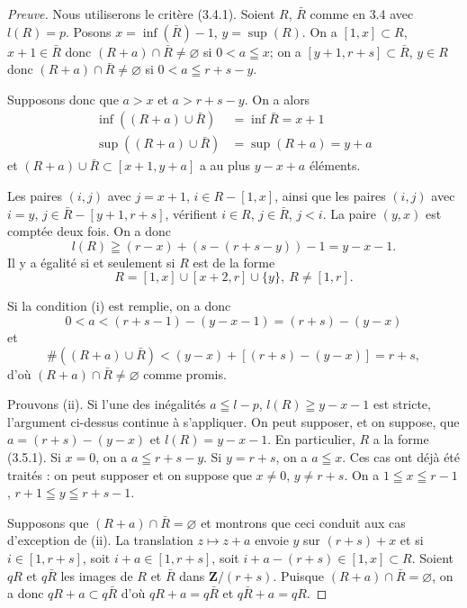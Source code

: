 \documentclass[12pt,a4paper]{article}
\theoremstyle{plain}
\theoremstyle{definition}
\begin{document}
\begin{proof}[Preuve]
Nous utiliserons le critère (3.4.1). Soient $R$, $\bar{R}$ comme en 3.4 avec $l(R) = p$. Posons $x = \inf(\bar{R}) - 1$, $y = \sup(R)$. On a $[1, x] \subset R$, $x+1 \in \bar{R}$ donc $(R+a) \cap \bar{R} \neq \varnothing$ si $0 < a \leqq x$; on a $[y+1, r+s] \subset \bar{R}$, $y \in R$ donc $(R+a) \cap \bar{R} \neq \varnothing$ si $0 < a \leqq r+s-y$.

Supposons donc que $a > x$ et $a > r+s-y$. On a alors
\begin{align*}
\inf((R+a) \cup \bar{R}) &= \inf \bar{R} = x+1 \\
\sup((R+a) \cup \bar{R}) &= \sup(R+a) = y+a
\end{align*}
et $(R+a) \cup \bar{R} \subset [x+1, y+a]$ a au plus $y-x+a$ éléments.

Les paires $(i, j)$ avec $j = x+1$, $i \in R - [1, x]$, ainsi que les paires $(i, j)$ avec $i = y$, $j \in \bar{R} - [y+1, r+s]$, vérifient $i \in R$, $j \in \bar{R}$, $j < i$. La paire $(y, x)$ est comptée deux fois. On a donc
\[
l(R) \geqq (r-x) + (s-(r+s-y)) - 1 = y - x - 1.
\]
Il y a égalité si et seulement si $R$ est de la forme
\begin{equation}\label{eq:3.5.1}
R = [1, x] \cup [x+2, r] \cup \{y\},\ R \neq [1, r].
\tag{3.5.1}
\end{equation}

Si la condition (i) est remplie, on a donc
\[
0 < a < (r+s-1) - (y-x-1) = (r+s) - (y-x)
\]
et
\[
\#((R+a) \cup \bar{R}) < (y-x) + [(r+s) - (y-x)] = r+s,
\]
d'où $(R+a) \cap \bar{R} \neq \varnothing$ comme promis.

Prouvons (ii). Si l'une des inégalités $a \leqq l-p$, $l(R) \geqq y-x-1$ est stricte, l'argument ci-dessus continue à s'appliquer. On peut supposer, et on suppose, que $a = (r+s) - (y-x)$ et $l(R) = y-x-1$. En particulier, $R$ a la forme (3.5.1). Si $x = 0$, on a $a \leqq r+s-y$. Si $y = r+s$, on a $a \leqq x$. Ces cas ont déjà été traités : on peut supposer et on suppose que $x \neq 0$, $y \neq r+s$. On a $1 \leqq x \leqq r-1$, $r+1 \leqq y \leqq r+s-1$.

Supposons que $(R+a) \cap \bar{R} = \varnothing$ et montrons que ceci conduit aux cas d'exception de (ii). La translation $z \mapsto z+a$ envoie $y$ sur $(r+s)+x$ et si $i \in [1, r+s]$, soit $i+a \in [1, r+s]$, soit $i+a-(r+s) \in [1, x] \subset R$. Soient $qR$ et $q\bar{R}$ les images de $R$ et $\bar{R}$ dans $\mathbf{Z}/(r+s)$. Puisque $(R+a) \cap \bar{R} = \varnothing$, on a donc $qR + a \subset q\bar{R}$ d'où $qR + a = q\bar{R}$ et $q\bar{R} + a = qR$.


\end{proof}
\end{document}
